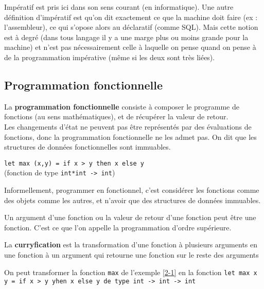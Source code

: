 \begin{rem}
	Impératif est pris ici dans son sens courant (en informatique). Une autre définition d'impératif est qu'on dit exactement ce que la machine doit faire (ex : l'assembleur), ce qui s'opose alors au déclaratif (comme SQL). Mais cette notion est à degré (dans tous langage il y a une marge plus ou moins grande pour la machine) et n'est pas nécessairement celle à laquelle on pense quand on pense à de la programmation impérative (même si les deux sont très liées).
\end{rem}

\subsection{Programmation fonctionnelle}

\begin{definition}
	La \textbf{programmation fonctionnelle} consiste à composer le programme de fonctions
	(au sens mathématiques), et de récupérer la valeur de retour.\\
	Les changements d'état ne peuvent pas être représentés par des évaluations de fonctions, donc la programmation fonctionnelle ne les admet pas. On dit que les structures de données fonctionnelles sont immuables.
\end{definition}

\begin{example}
		\lstinline|let max (x,y) = if x > y then x else y| \\ (fonction de type \lstinline|int*int -> int|) \label{2-1}
\end{example}

Informellement, programmer en fonctionnel, c'est considérer les fonctions comme des objets comme les autres, et n'avoir que des structures de données immuables.

\begin{rem}
	Un argument d'une fonction ou la valeur de retour d'une fonction peut être une fonction. C'est ce que l'on appelle la  programmation d'ordre supérieure.
\end{rem}

\begin{definition}
	La \textbf{curryfication} est la transformation d'une fonction à plusieurs arguments en une fonction à un argument qui retourne une fonction sur le reste des arguments
\end{definition}

\begin{example}
	On peut transformer la fonction \lstinline|max| de l'exemple \ref{2-1} en la fonction \lstinline|let max x y = if x > y yhen x else y de type int -> int -> int| \label{2-2}
\end{example}

